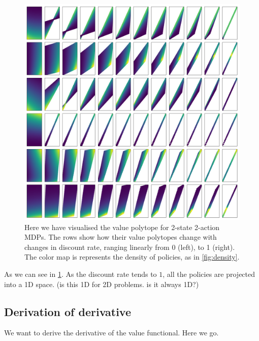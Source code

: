 \begin{figure}
\centering
\includegraphics[width=1\textwidth,height=1\textheight]{../../pictures/figures/discounts.png}
\caption{Here we have visualised the value polytope for 2-state 2-action MDPs. The
rows show how their value polytopes change with changes in discount rate, ranging linearly from 0 (left), to 1 (right).
The color map is represents the density of policies, as in \ref{fig:density}.}
\label{fig:polytope-discounts}
\end{figure}

As we can see in \ref{fig:polytope-discounts}. As the discount rate tends to $1$,
all the policies are projected into a 1D space. (is this 1D for 2D problems. is it always 1D?)

\subsection{Derivation of derivative}

We want to derive the derivative of the value functional. Here we go.

